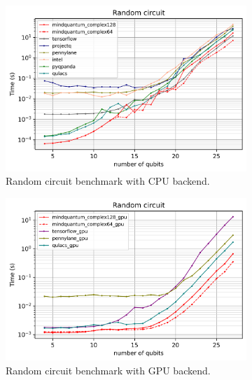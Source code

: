 \begin{figure}
    \centering
    \begin{subfigure}{0.45\textwidth}
        \centering
        \includegraphics[width=\textwidth]{images/7_Random_circuit_CPU.png}
        \caption{Random circuit benchmark with CPU backend.}
        \label{7_random_circ_cpu}
    \end{subfigure}
    \begin{subfigure}{0.45\textwidth}
        \centering
        \includegraphics[width=\textwidth]{images/7_Random_circuit_GPU.png}
        \caption{Random circuit benchmark with GPU backend.}
        \label{7_random_circ_gpu}
    \end{subfigure}
    \begin{subfigure}{0.45\textwidth}
        \centering

\end{subfigure}
\end{figure}
